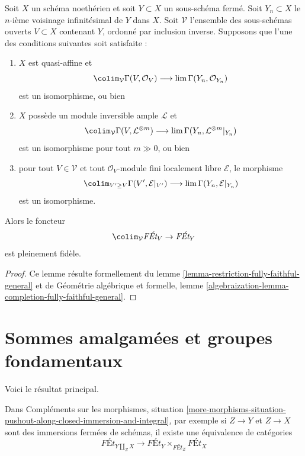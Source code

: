 \begin{lemma}
\label{lemma-restriction-fully-faithful-general-special}
Soit $X$ un schéma noethérien et soit $Y \subset X$ un sous-schéma fermé.
Soit $Y_n \subset X$ le $n$-ième voisinage infinitésimal de $Y$ dans $X$.
Soit $\mathcal{V}$ l'ensemble des sous-schémas ouverts $V \subset X$ contenant $Y$,
ordonné par inclusion inverse. Supposons que l'une des conditions suivantes soit satisfaite :
\begin{enumerate}
\item $X$ est quasi-affine et
$$
\colim_\mathcal{V} \Gamma(V, \mathcal{O}_V)
\longrightarrow
\lim \Gamma(Y_n, \mathcal{O}_{Y_n})
$$
est un isomorphisme, ou bien
\item $X$ possède un module inversible ample $\mathcal{L}$ et
$$
\colim_\mathcal{V} \Gamma(V, \mathcal{L}^{\otimes m})
\longrightarrow
\lim \Gamma(Y_n, \mathcal{L}^{\otimes m}|_{Y_n})
$$
est un isomorphisme pour tout $m \gg 0$, ou bien
\item pour tout $V \in \mathcal{V}$ et tout
$\mathcal{O}_V$-module fini localement libre $\mathcal{E}$, le morphisme
$$
\colim_{V' \geq V} \Gamma(V', \mathcal{E}|_{V'})
\longrightarrow
\lim \Gamma(Y_n, \mathcal{E}|_{Y_n})
$$
est un isomorphisme.
\end{enumerate}
Alors le foncteur
$$
\colim_\mathcal{V} \textit{F\'Et}_V \to \textit{F\'Et}_Y
$$
est pleinement fidèle.
\end{lemma}

\begin{proof}
Ce lemme résulte formellement du
lemme \ref{lemma-restriction-fully-faithful-general} et de
Géométrie algébrique et formelle, lemme
\ref{algebraization-lemma-completion-fully-faithful-general}.
\end{proof}






\section{Sommes amalgamées et groupes fondamentaux}
\label{section-pushouts}

\noindent
Voici le résultat principal.

\begin{lemma}
\label{lemma-pushout-along-closed-immersion-and-integral}
Dans Compléments sur les morphismes, situation
\ref{more-morphisms-situation-pushout-along-closed-immersion-and-integral},
par exemple si $Z \to Y$ et $Z \to X$ sont des immersions fermées de schémas,
il existe une équivalence de catégories
$$
\textit{F\'Et}_{Y \amalg_Z X}
\longrightarrow
\textit{F\'Et}_Y
\times_{\textit{F\'Et}_Z}
\textit{F\'Et}_X
$$
\end{lemma}


